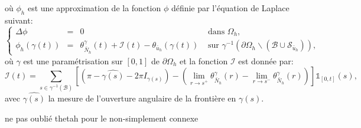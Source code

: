 où $\phi_h$ est une approximation de la fonction $\phi$ définie par l'équation de Laplace suivant:\begin{equation}
\left\{
\begin{array}{lcll}
\Delta\phi &=& 0 &\mbox{ dans }\Omega_h,\\[0.5cm]
\phi_h(\gamma(t))&=&\theta^\gamma_{\bar{N}_h}(t)+\mathcal{I}(t)-\theta_{\bar{u}_h}(\gamma(t)) & \mbox{ sur } \gamma^{-1}(\partial\Omega_h\backslash(\mathcal{B}\cup\mathcal{S}_{\bar{u}_h})),
\end{array}
\right.
\end{equation}
où $\gamma$ est une paramétrisation sur $[0, 1]$ de $\partial\Omega_h$ et la fonction $\mathcal{I}$ est donnée par:
$$
\mathcal{I}(t)=\displaystyle\sum_{s\in\gamma^{-1}(\mathcal{B})}\left[\left(\pi-\widehat{\gamma(s)}-2\pi I_{\gamma(s)}\right)-\left(\displaystyle\lim\limits_{r\rightarrow s^+}\theta^{\gamma}_{\bar{N}_h}(r) - \lim\limits_{r\rightarrow s^-}\theta^{\gamma}_{\bar{N}_h}(r)\right)\right]\mathbb{1}_{[0, t]}(s),
$$
avec $\widehat{\gamma(s)}$ la mesure de l'ouverture angulaire de la frontière en $\gamma(s)$.

ne pas oublié thetah pour le non-simplement connexe

